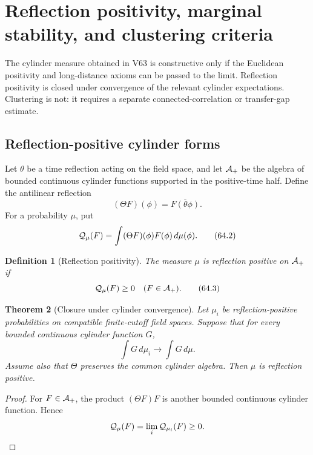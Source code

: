 \documentclass[11pt]{article}
\newtheorem{theorem}{Theorem}[section]
\newtheorem{definition}[theorem]{Definition}
\begin{document}
\section{Reflection positivity, marginal stability, and clustering
criteria}
\label{sec:v11v64}

The cylinder measure obtained in V63 is constructive only if the
Euclidean positivity and long-distance axioms can be passed to the
limit.  Reflection positivity is closed under convergence of the
relevant cylinder expectations.  Clustering is not: it requires a
separate connected-correlation or transfer-gap estimate.

\subsection{Reflection-positive cylinder forms}

Let \(\theta\) be a time reflection acting on the field space, and let
\({\cal A}_+\) be the algebra of bounded continuous cylinder functions
supported in the positive-time half.  Define the antilinear reflection
\[
                         (\Theta F)(\phi)
                    =\overline{F(\theta\phi)}.                 \tag{64.1}
\]
For a probability \(\mu\), put
\[
                         {\cal Q}_\mu(F)
                    =\int(\Theta F)(\phi)F(\phi)\,d\mu(\phi). \tag{64.2}
\]

\begin{definition}[Reflection positivity]
\label{def:v11v64-rp}
The measure \(\mu\) is reflection positive on \({\cal A}_+\) if
\[
                              {\cal Q}_\mu(F)\ge0
                              \quad(F\in{\cal A}_+).           \tag{64.3}
\]
\end{definition}

\begin{theorem}[Closure under cylinder convergence]
\label{thm:v11v64-limit}
Let \(\mu_i\) be reflection-positive probabilities on compatible
finite-cutoff field spaces.  Suppose that for every bounded continuous
cylinder function \(G\),
\[
                              \int G\,d\mu_i\longrightarrow
                              \int G\,d\mu.                    \tag{64.4}
\]
Assume also that \(\Theta\) preserves the common cylinder algebra.
Then \(\mu\) is reflection positive.
\end{theorem}

\begin{proof}
For \(F\in{\cal A}_+\), the product \((\Theta F)F\) is another bounded
continuous cylinder function.  Hence
\[
 {\cal Q}_\mu(F)
 =\lim_i{\cal Q}_{\mu_i}(F)\ge0.
\]
\end{proof}
\end{document}
